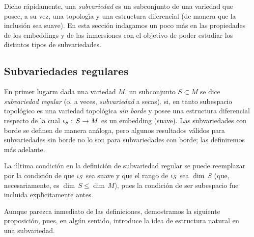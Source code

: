 \theoremstyle{plain}
\newtheorem{teoDeLasFetas}{Teorema}[section]
\newtheorem{propoEmbeddingEsEmbedding}[teoDeLasFetas]{Proposici\'{o}n}
\newtheorem{propoRegularCerradaSiiPropia}[teoDeLasFetas]{Proposici\'{o}n}
\newtheorem{lemaContinuaPropia}[teoDeLasFetas]{Lema}
\newtheorem{lemaPropiaEsCerrada}[teoDeLasFetas]{Lema}
\newtheorem{teoDeLosConjuntosDeNivel}[teoDeLasFetas]{Teorema}
\newtheorem{coroDelValorRegular}[teoDeLasFetas]{Corolario}
\newtheorem{propoRegularEsLocalmenteDeNivel}[teoDeLasFetas]{Proposici\'{o}n}
\newtheorem{propoInmersaEsInmersa}[teoDeLasFetas]{Proposici\'{o}n}
\newtheorem{propoDeLasParametrizaciones}[teoDeLasFetas]{Proposici\'{o}n}

\theoremstyle{remark}
\newtheorem{obsCuandoInmersaEsRegular}{Observaci\'{o}n}[section]


Dicho r\'{a}pidamente, una \emph{subvariedad} es un subconjunto de una
variedad que posee, a su vez, una topolog\'{\i}a y una estructura diferencial
(de manera que la inclusi\'{o}n sea suave). En esta secci\'{o}n indagamos un
poco m\'{a}s en las propiedades de los embeddings y de las inmersiones
con el objetivo de poder estudiar los distintos tipos de subvariedades.

\subsection{Subvariedades regulares}
En primer lugarm dada una variedad $M$, un subconjunto $S\subset M$ se dice
\emph{subvariedad regular} (o, a veces, \emph{subvariedad} a secas), si,
en tanto subespacio topol\'{o}gico es una variedad topol\'{o}gica
\emph{sin borde} y posee una estructura diferencial respecto de la cual
$\inc[S]:\,S\rightarrow M$ es un embedding (suave). Las subvariedades con
borde se definen de manera an\'{a}loga, pero algunos resultados v\'{a}lidos
para subvariedades sin borde no lo son para subvariedades con borde; las
definiremos m\'{a}s adelante.

La \'{u}ltima condici\'{o}n en la definici\'{o}n de subvariedad regular
se puede reemplazar por la condici\'{o}n de que $\inc[S]$ sea suave y que
el rango de $\inc[S]$ sea $\dim\,S$ (que, necesariamente, es
$\dim\,S\leq\dim\,M$), pues la condici\'{o}n de ser subespacio fue
incluida expl\'{\i}citamente antes.

Aunque parezca inmediato de las definiciones, demostramos la siguiente
proposici\'{o}n, pues, en alg\'{u}n sentido, introduce la idea de estructura
natural en una subvariedad.


